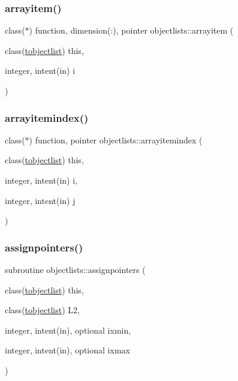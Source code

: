 \mbox{\label{namespaceobjectlists_a72ee9292ce07a71798b7b6ac5b3cb6c3}} 
\subsubsection{\texorpdfstring{arrayitem()}{arrayitem()}}
{\footnotesize\ttfamily class($\ast$) function, dimension(\+:), pointer objectlists\+::arrayitem (\begin{DoxyParamCaption}\item[{class(\mbox{\hyperlink{structobjectlists_1_1tobjectlist}{tobjectlist}})}]{this,  }\item[{integer, intent(in)}]{i }\end{DoxyParamCaption})\hspace{0.3cm}{\ttfamily [private]}}

\mbox{\label{namespaceobjectlists_aef8a1d27db060a7e7289e5ee3849ce21}} 
\subsubsection{\texorpdfstring{arrayitemindex()}{arrayitemindex()}}
{\footnotesize\ttfamily class($\ast$) function, pointer objectlists\+::arrayitemindex (\begin{DoxyParamCaption}\item[{class(\mbox{\hyperlink{structobjectlists_1_1tobjectlist}{tobjectlist}})}]{this,  }\item[{integer, intent(in)}]{i,  }\item[{integer, intent(in)}]{j }\end{DoxyParamCaption})\hspace{0.3cm}{\ttfamily [private]}}

\mbox{\label{namespaceobjectlists_a4fc2d0e75594a82db02035609ddab0d5}} 
\subsubsection{\texorpdfstring{assignpointers()}{assignpointers()}}
{\footnotesize\ttfamily subroutine objectlists\+::assignpointers (\begin{DoxyParamCaption}\item[{class(\mbox{\hyperlink{structobjectlists_1_1tobjectlist}{tobjectlist}})}]{this,  }\item[{class(\mbox{\hyperlink{structobjectlists_1_1tobjectlist}{tobjectlist}})}]{L2,  }\item[{integer, intent(in), optional}]{ixmin,  }\item[{integer, intent(in), optional}]{ixmax }\end{DoxyParamCaption})\hspace{0.3cm}{\ttfamily [private]}}

